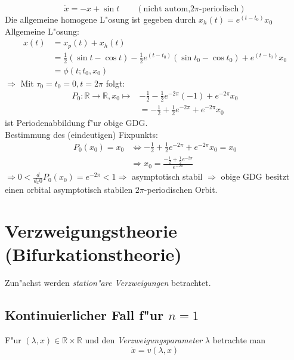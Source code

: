 \documentclass[a4paper, 13pt]{scrreprt}
\theoremstyle{definition} \newtheorem{definition}{Definition}[section]
\newenvironment{beispiel}[1][Beispiel]{\begin{trivlist}
\item[\hskip \labelsep {\bfseries #1}]}{\end{trivlist}}
\newcommand{\RR}{\mathbb{R}}
\begin{document}
\begin{beispiel}
	\[\dot{x} = -x + \sin t \qquad (\text{nicht autom,} 2\pi \text{-periodisch})\]
	Die allgemeine homogene L"osung ist gegeben durch \(x_h(t) = e^{(t-t_0)}x_0\)
	Allgemeine L"osung: 
		\begin{align*} x(t) &= x_p(t) + x_h(t) \\
			& = \frac 1 2 (\sin t - \cos t) - \frac 1 2 e^{(t-t_0)}(\sin t_0 - \cos t_0) + e^{(t-t_0)}x_0\\
			&= \phi(t; t_0,x_0)
		\end{align*}
	\(\Rightarrow\) Mit \(\tau_0=t_0=0, t = 2\pi\) folgt:
		\begin{align*} P_0 : \mathbb{R} \to \mathbb{R}, x_0 \mapsto &-\frac 1 2 - \frac 1 2 e^{-2\pi}(-1)+e^{-2\pi}x_0\\
			& = -\frac 1 2 + \frac 1 2 e^{-2\pi} + e^{-2\pi}x_0
		\end{align*}
	ist Periodenabbildung f"ur obige GDG.\\
	Bestimmung des (eindeutigen) Fixpunkts: 
		\begin{align*} P_0(x_0)=x_0 &\Leftrightarrow -\frac 1 2 + \frac 1 2 e^{-2\pi} + e^{-2\pi}x_0 = x_0 \\
		&\Rightarrow x_0 = \frac{-\frac 1 2 + \frac 1 2 e^{-2\pi}} {e^{-2\pi}}
		\end{align*}
		\(\Rightarrow 0 < \frac{d}{d_x0} P_0(x_0) = e^{-2\pi}< 1 \Rightarrow\) asymptotisch stabil \(\Rightarrow\) obige GDG besitzt einen orbital asymptotisch stabilen \(2\pi\)-periodischen Orbit.
	
\end{beispiel}


\chapter{Verzweigungstheorie (Bifurkationstheorie)}

Zun"achst werden \emph{station"are Verzweigungen} betrachtet.

\section{Kontinuierlicher Fall f"ur $n=1$}

F"ur $(\lambda,x)\in\RR\times\RR$ und den \emph{Verzweigungsparameter} $\lambda$ betrachte man
\[
\dot x = v(\lambda,x)
\]
\end{document}
